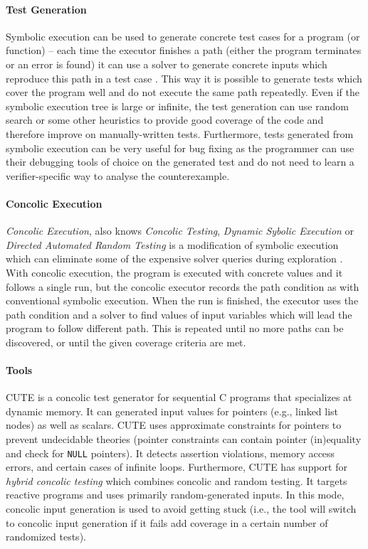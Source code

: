 \paragraph{Test Generation}

Symbolic execution can be used to generate concrete test cases for a program (or function) -- each time the executor finishes a path (either the program terminates or an error is found) it can use a solver to generate concrete inputs which reproduce this path in a test case .
This way it is possible to generate tests which cover the program well and do not execute the same path repeatedly.
Even if the symbolic execution tree is large or infinite, the test generation can use random search or some other heuristics to provide good coverage of the code and therefore improve on manually-written tests.
Furthermore, tests generated from symbolic execution can be very useful for bug fixing as the programmer can use their debugging tools of choice on the generated test and do not need to learn a verifier-specific way to analyse the counterexample.

\paragraph{Concolic Execution}

\emph{Concolic Execution}, also knows \emph{Concolic Testing}, \emph{Dynamic Sybolic Execution} or \emph{Directed Automated Random Testing} is a modification of symbolic execution which can eliminate some of the expensive solver queries during exploration .
With concolic execution, the program is executed with concrete values and it follows a single run, but the concolic executor records the path condition as with conventional symbolic execution.
When the run is finished, the executor uses the path condition and a solver to find values of input variables which will lead the program to follow different path.
This is repeated until no more paths can be discovered, or until the given coverage criteria are met.

\paragraph{Tools}

CUTE  is a concolic test generator for sequential C programs that specializes at dynamic memory.
It can generated input values for pointers (e.g., linked list nodes) as well as scalars.
CUTE uses approximate constraints for pointers to prevent undecidable theories (pointer constraints can contain pointer (in)equality and check for \texttt{NULL} pointers).
It detects assertion violations, memory access errors, and certain cases of infinite loops.
Furthermore, CUTE has support for \emph{hybrid concolic testing} which combines concolic and random testing.
It targets reactive programs and uses primarily random-generated inputs.
In this mode, concolic input generation is used to avoid getting stuck (i.e., the tool will switch to concolic input generation if it fails add coverage in a certain number of randomized tests).

